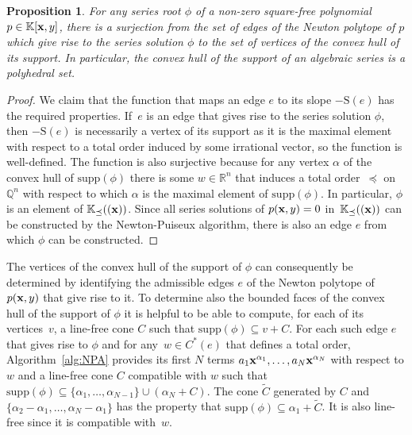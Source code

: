 \documentclass[a4paper,draft]{amsart}
\newtheorem{Proposition}{Proposition}
\theoremstyle{definition}
\begin{document}
\begin{Proposition}\label{prop:support}
For any series root $\phi$ of a non-zero square-free polynomial~$p\in\mathbb{K}[\bold{x},y]$, there is a surjection from the set of edges of the Newton polytope of $p$ which give rise to the series solution $\phi$ to the set of vertices of the convex hull of its support. In particular, the convex hull of the support of an algebraic series is a polyhedral set.
\end{Proposition}
\begin{proof}
We claim that the function that maps an edge $e$ to its slope $-\mathrm{S}(e)$ has the required properties. If~$e$ is an edge that gives rise to the series solution $\phi$, then $-\mathrm{S}(e)$ is necessarily a vertex of its support as it is the maximal element with respect to a total order induced by some irrational vector, so the function is well-defined. The function is also surjective because for any vertex $\alpha$ of the convex hull of $\mathrm{supp}(\phi)$ there is some $w\in\mathbb{R}^n$ that induces a total order~$\preceq$ on~$\mathbb{Q}^n$ with respect to which $\alpha$ is the maximal element of $\mathrm{supp}(\phi)$. In particular, $\phi$ is an element of $\mathbb{K}_{\preceq}((\bold{x}))$. Since all series solutions of $p(\bold{x},y) = 0$ in~$\mathbb{K}_{\preceq}((\bold{x}))$ can be constructed by the Newton-Puiseux algorithm, there is also an edge $e$ from which $\phi$ can be constructed. 
\end{proof}
The vertices of the convex hull of the support of $\phi$ can consequently be determined by identifying the admissible edges $e$ of the Newton polytope of~$p(\bold{x},y)$ that give rise to it. To determine also the bounded faces of the convex hull of the support of $\phi$ it is helpful to be able to compute, for each of its vertices~$v$, a line-free cone $C$ such that $\mathrm{supp}(\phi)\subseteq v + C$. For each such edge $e$ that gives rise to $\phi$ and for any~$w\in C^*(e)$ that defines a total order, Algorithm~\ref{alg:NPA} provides its first $N$ terms $a_1\bold{x}^{\alpha_1},\dots,a_N\bold{x}^{\alpha_N}$ with respect to $w$ and a line-free cone $C$ compatible with $w$ such that $\mathrm{supp}(\phi)\subseteq \{\alpha_1,\dots,\alpha_{N-1}\}\cup (\alpha_N + C)$. The cone $\tilde{C}$ generated by $C$ and~$\{\alpha_2-\alpha_1,\dots,\alpha_N-\alpha_1\}$ has the property that $\mathrm{supp}(\phi)\subseteq \alpha_1 + \tilde{C}$. It is also line-free since it is compatible with~$w$.
\end{document}
